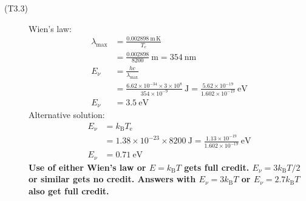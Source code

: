 \begin{description}
\item[(T3.3)] Wien's law:
\begin{align*}
\lambda_{\max} &= \frac{0.002898\ \mathrm{m\,K}}{T_e}\\
  &= \frac{0.002898}{8200}\ \mathrm{m} = 354\ \mathrm{nm} \tag*{(1.0)}\\
E_\nu &= \frac{hc}{\lambda_{\max}}\\
  &= \frac{6.62\times10^{-34}\times3\times10^{8}}{354\times10^{-9}}\
     \mathrm{J}
   = \frac{5.62\times10^{-19}}{1.602\times10^{-19}}\ \mathrm{eV}
  \tag*{(1.0)}\\
E_\nu &= 3.5\ \mathrm{eV} \tag*{(1.0)}
\end{align*}
Alternative solution:
\begin{align*}
E_\nu &= k_{\mathrm{B}}T_{\mathrm{e}}\\
  &= 1.38\times10^{-23}\times8200\ \mathrm{J}
   = \frac{1.13\times10^{-19}}{1.602\times10^{-19}}\ \mathrm{eV}
  \tag*{(2.0)}\\
E_\nu &= 0.71\ \mathrm{eV} \tag*{(1.0)}
\end{align*}
\textbf{Use of either Wien's law or $E = k_{\mathrm{B}}T$ gets full credit.
$E_\nu = 3k_{\mathrm{B}}T/2$ or similar gets no credit. Answers with
$E_\nu = 3k_{\mathrm{B}}T$ or $E_\nu = 2.7k_{\mathrm{B}}T$ also get full
credit.}
\end{description}
